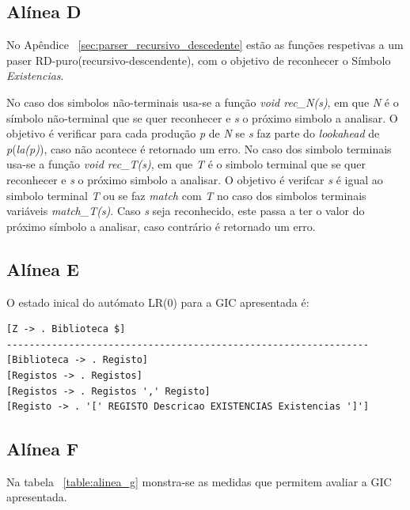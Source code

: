 \subsection{Alínea D} %
\label{sub:alinea_d}

No Apêndice ~\ref{sec:parser_recursivo_descedente} estão as funções respetivas a um paser RD-puro(recursivo-descendente), com o objetivo de reconhecer o Símbolo \emph{Existencias}.

No caso dos simbolos não-terminais usa-se a função \emph{void rec\_N(s)}, em que \emph{N} é o símbolo não-terminal que se quer reconhecer e \emph{s} o próximo simbolo a analisar. O objetivo é verificar para cada produção \emph{p} de \emph{N} se \emph{s} faz parte do \emph{lookahead} de \emph{p}(\emph{la(p)}), caso não acontece é retornado um erro.
No caso dos simbolo terminais usa-se a função \emph{void rec\_T(s)}, em que \emph{T} é o simbolo terminal que se quer reconhecer e \emph{s} o próximo simbolo a analisar. O objetivo é verifcar \emph{s} é igual ao simbolo terminal \emph{T} ou se faz \emph{match} com \emph{T} no caso dos simbolos terminais variáveis \emph{match\_T(s)}. Caso \emph{s} seja reconhecido, este passa a ter o valor do próximo símbolo a analisar, caso contrário é retornado um erro.



\subsection{Alínea E} %
\label{sub:alinea_e}

O estado inical do autómato LR(0) para a GIC apresentada é:

\begin{verbatim}
[Z -> . Biblioteca $]
----------------------------------------------------------------
[Biblioteca -> . Registo]
[Registos -> . Registos]
[Registos -> . Registos ',' Registo]
[Registo -> . '[' REGISTO Descricao EXISTENCIAS Existencias ']']
\end{verbatim}

\subsection{Alínea F} %
\label{sub:alinea_f}

Na tabela ~\ref{table:alinea_g} monstra-se as medidas que permitem avaliar a GIC apresentada.


